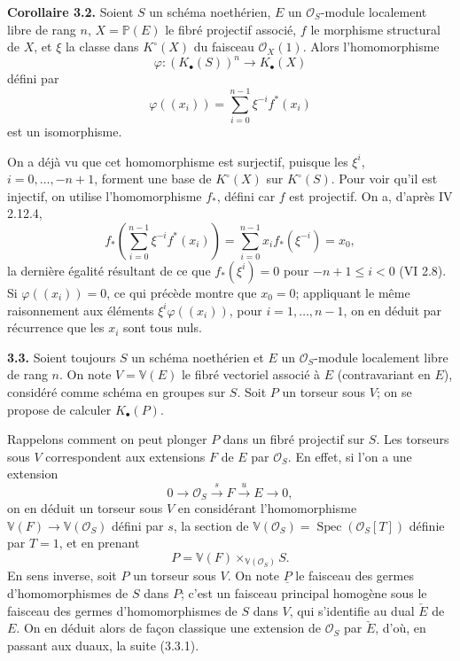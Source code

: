 \documentclass[11pt]{article}
\newcommand{\Spec}{\operatorname{Spec}}
\begin{document}
\textbf{Corollaire 3.2.} Soient $S$ un schéma noethérien, $E$ un $\mathcal O_S$-module localement libre de rang $n$, $X=\mathbb P(E)$ le fibré projectif associé, $f$ le morphisme structural de $X$, et $\xi$ la classe dans $K^\circ(X)$ du faisceau $\mathcal O_X(1)$. Alors l'homomorphisme
\[
\varphi:(K_\bullet(S))^n\longrightarrow K_\bullet(X)
\]
défini par
\[
\varphi((x_i))=\sum_{i=0}^{n-1}\xi^{-i}f^*(x_i)
\]
est un isomorphisme.

On a déjà vu que cet homomorphisme est surjectif, puisque les $\xi^i$, $i=0,\ldots,-n+1$, forment une base de $K^\circ(X)$ sur $K^\circ(S)$. Pour voir qu'il est injectif, on utilise l'homomorphisme $f_*$, défini car $f$ est projectif. On a, d'après IV 2.12.4,
\[
f_*\left(\sum_{i=0}^{n-1}\xi^{-i}f^*(x_i)\right)
=\sum_{i=0}^{n-1}x_i f_*(\xi^{-i})=x_0,
\]
la dernière égalité résultant de ce que $f_*(\xi^i)=0$ pour $-n+1\le i<0$ (VI 2.8). Si $\varphi((x_i))=0$, ce qui précède montre que $x_0=0$; appliquant le même raisonnement aux éléments $\xi^i\varphi((x_i))$, pour $i=1,\ldots,n-1$, on en déduit par récurrence que les $x_i$ sont tous nuls.

\textbf{3.3.} Soient toujours $S$ un schéma noethérien et $E$ un $\mathcal O_S$-module localement libre de rang $n$. On note $V=\mathbb V(E)$ le fibré vectoriel associé à $E$ (contravariant en $E$), considéré comme schéma en groupes sur $S$. Soit $P$ un torseur sous $V$; on se propose de calculer $K_\bullet(P)$.

Rappelons comment on peut plonger $P$ dans un fibré projectif sur $S$. Les torseurs sous $V$ correspondent aux extensions $F$ de $E$ par $\mathcal O_S$. En effet, si l'on a une extension
\[
0\longrightarrow \mathcal O_S\xrightarrow{s}F\xrightarrow{u}E\longrightarrow 0,
\tag{3.3.1}
\]
on en déduit un torseur sous $V$ en considérant l'homomorphisme $\mathbb V(F)\to \mathbb V(\mathcal O_S)$ défini par $s$, la section de $\mathbb V(\mathcal O_S)=\Spec(\mathcal O_S[T])$ définie par $T=1$, et en prenant
\[
P=\mathbb V(F)\times_{\mathbb V(\mathcal O_S)}S.
\]
En sens inverse, soit $P$ un torseur sous $V$. On note $\underline P$ le faisceau des germes d'homomorphismes de $S$ dans $P$; c'est un faisceau principal homogène sous le faisceau des germes d'homomorphismes de $S$ dans $V$, qui s'identifie au dual $\check E$ de $E$. On en déduit alors de façon classique une extension de $\mathcal O_S$ par $\check E$, d'où, en passant aux duaux, la suite (3.3.1).
\end{document}
